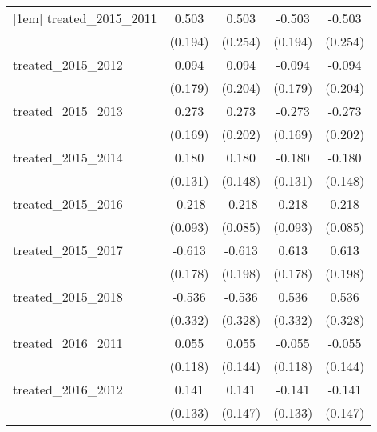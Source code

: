 {\begin{tabular}{l*{4}{c}}
[1em]
treated\_2015\_2011&       0.503\sym{**} &       0.503\sym{*}  &      -0.503\sym{**} &      -0.503\sym{*}  \\
            &     (0.194)         &     (0.254)         &     (0.194)         &     (0.254)         \\
[1em]
treated\_2015\_2012&       0.094         &       0.094         &      -0.094         &      -0.094         \\
            &     (0.179)         &     (0.204)         &     (0.179)         &     (0.204)         \\
[1em]
treated\_2015\_2013&       0.273         &       0.273         &      -0.273         &      -0.273         \\
            &     (0.169)         &     (0.202)         &     (0.169)         &     (0.202)         \\
[1em]
treated\_2015\_2014&       0.180         &       0.180         &      -0.180         &      -0.180         \\
            &     (0.131)         &     (0.148)         &     (0.131)         &     (0.148)         \\
[1em]
treated\_2015\_2016&      -0.218\sym{*}  &      -0.218\sym{*}  &       0.218\sym{*}  &       0.218\sym{*}  \\
            &     (0.093)         &     (0.085)         &     (0.093)         &     (0.085)         \\
[1em]
treated\_2015\_2017&      -0.613\sym{***}&      -0.613\sym{**} &       0.613\sym{***}&       0.613\sym{**} \\
            &     (0.178)         &     (0.198)         &     (0.178)         &     (0.198)         \\
[1em]
treated\_2015\_2018&      -0.536         &      -0.536         &       0.536         &       0.536         \\
            &     (0.332)         &     (0.328)         &     (0.332)         &     (0.328)         \\
[1em]
treated\_2016\_2011&       0.055         &       0.055         &      -0.055         &      -0.055         \\
            &     (0.118)         &     (0.144)         &     (0.118)         &     (0.144)         \\
[1em]
treated\_2016\_2012&       0.141         &       0.141         &      -0.141         &      -0.141         \\
            &     (0.133)         &     (0.147)         &     (0.133)         &     (0.147)         \\

\end{tabular}}
